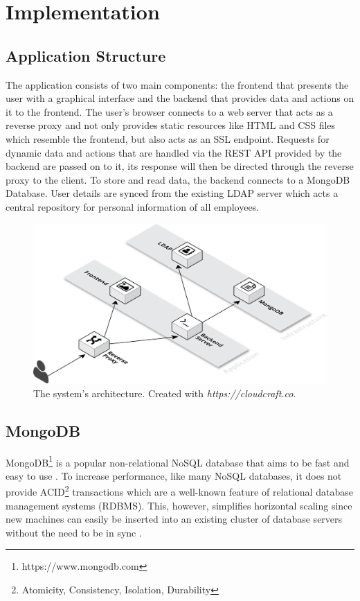 \chapter{Implementation}
\section{Application Structure}
The application consists of two main components: the frontend that presents the user with a graphical interface and the backend that provides data and actions on it to the frontend.
The user's browser connects to a web server that acts as a reverse proxy and not only provides static resources like HTML and CSS files which resemble the frontend, but also acts as an SSL endpoint.
Requests for dynamic data and actions that are handled via the REST API provided by the backend are passed on to it, its response will then be directed through the reverse proxy to the client.
To store and read data, the backend connects to a MongoDB Database. User details are synced from the existing LDAP server which acts a central repository for personal information of all employees.
\begin{figure}[h]
    \centering
    \includegraphics[width=\textwidth]{images/system_architecture.png}
    \caption[System Architecture]{The system's architecture. Created with \textit{https://cloudcraft.co}.}
    \label{fig:markovchain}
\end{figure}

\newpage
\section{MongoDB}
MongoDB\footnote{https://www.mongodb.com} is a popular non-relational NoSQL database that aims to be fast and easy to use \cite[p. 10]{MongoGuide}. To increase performance, like many NoSQL databases, it does not provide ACID\footnote{Atomicity, Consistency, Isolation, Durability} transactions which are a well-known feature of relational database management systems (RDBMS). This, however, simplifies horizontal scaling since new machines can easily be inserted into an existing cluster of database servers without the need to be in sync \cite[p. 3]{MongoGuide}.

